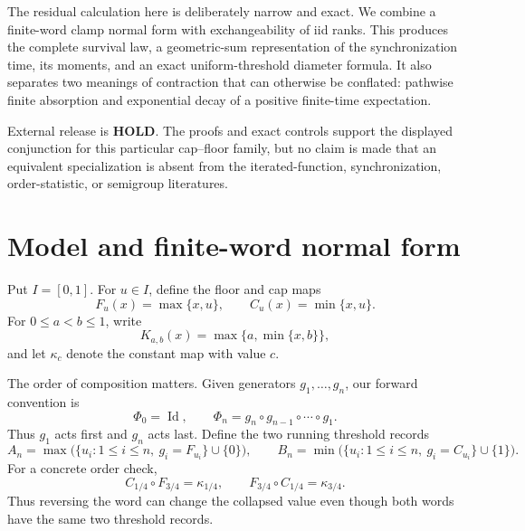 \documentclass[11pt,a4paper]{amsart}
\theoremstyle{definition}
\theoremstyle{remark}
\newcommand{\Id}{\operatorname{Id}}
\begin{document}
The residual calculation here is deliberately narrow and exact.  We
combine a finite-word clamp normal form with exchangeability of iid ranks.
This produces the complete survival law, a geometric-sum representation of
the synchronization time, its moments, and an exact uniform-threshold
diameter formula.  It also separates two meanings of contraction that can
otherwise be conflated: pathwise finite absorption and exponential decay of
a positive finite-time expectation.

External release is \textbf{HOLD}.  The proofs and exact controls support
the displayed conjunction for this particular cap--floor family, but no
claim is made that an equivalent specialization is absent from the
iterated-function, synchronization, order-statistic, or semigroup
literatures.

\section{Model and finite-word normal form}
\label{sec:normal}

Put $I=[0,1]$.  For $u\in I$, define the floor and cap maps
\begin{equation}\label{eq:generators}
 F_u(x)=\max\{x,u\},\qquad C_u(x)=\min\{x,u\}.
\end{equation}
For $0\leq a<b\leq1$, write
\begin{equation}\label{eq:clamp}
 K_{a,b}(x)=\max\{a,\min\{x,b\}\},
\end{equation}
and let $\kappa_c$ denote the constant map with value $c$.

The order of composition matters.  Given generators $g_1,\ldots,g_n$, our
forward convention is
\begin{equation}\label{eq:composition}
 \Phi_0=\Id,\qquad
 \Phi_n=g_n\circ g_{n-1}\circ\cdots\circ g_1.
\end{equation}
Thus $g_1$ acts first and $g_n$ acts last.  Define the two running threshold
records
\begin{equation}\label{eq:records}
 A_n=\max\bigl(\{u_i:1\leq i\leq n,\ g_i=F_{u_i}\}\cup\{0\}\bigr),
 \qquad
 B_n=\min\bigl(\{u_i:1\leq i\leq n,\ g_i=C_{u_i}\}\cup\{1\}\bigr).
\end{equation}
For a concrete order check,
\begin{equation}\label{eq:order-sentinel}
 C_{1/4}\circ F_{3/4}=\kappa_{1/4},
 \qquad
 F_{3/4}\circ C_{1/4}=\kappa_{3/4}.
\end{equation}
Thus reversing the word can change the collapsed value even though both
words have the same two threshold records.
\end{document}
